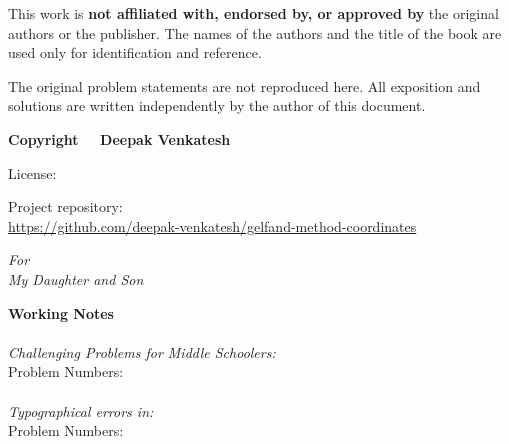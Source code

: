 \documentclass[10pt]{article}
\begin{document}
\noindent
This work is \textbf{not affiliated with, endorsed by, or approved by} the original
authors or the publisher. The names of the authors and the title of the book are used
only for identification and reference.

\vspace{0.4cm}

\noindent
The original problem statements are not reproduced here. All exposition and solutions
are written independently by the author of this document.

\vspace{1.5cm}

\noindent
\textbf{Copyright \textcopyright\ \the\year\ Deepak Venkatesh}

\vspace{1.5cm}

\noindent
License: \doclicenseThis

\vfill

\noindent
Project repository:\\
\href{https://github.com/deepak-venkatesh/gelfand-method-coordinates}{https://github.com/deepak-venkatesh/gelfand-method-coordinates}

\clearpage

\newpage
\thispagestyle{empty}

\vspace*{\fill}
\begin{center}
\textit{For\\[0.5em]
My Daughter and Son}
\end{center}
\vspace*{\fill}
\newpage
\tableofcontents
\newpage %

\textbf{Working Notes}\\\\

\emph{Challenging Problems for Middle Schoolers:}\\

Problem Numbers:  \\\\

\emph{Typographical errors in:}\\

Problem Numbers: 

\newpage
\end{document}
